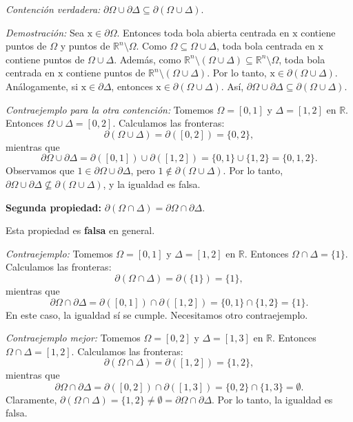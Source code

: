 \documentclass[12pt]{article}
\newcommand{\R}{\mathbb R}
\newcommand{\x}{\mathrm x}
\begin{document}
\begin{enumerate}
\begin{enumerate}[(1)]
\textit{Contención verdadera:} $\partial \Omega \cup \partial \Delta \subseteq \partial(\Omega \cup \Delta)$.

\textit{Demostración:} Sea $\x \in \partial \Omega$. Entonces toda bola abierta centrada en $\x$ contiene puntos de $\Omega$ y puntos de $\R^n \setminus \Omega$. Como $\Omega \subseteq \Omega \cup \Delta$, toda bola centrada en $\x$ contiene puntos de $\Omega \cup \Delta$. Además, como $\R^n \setminus (\Omega \cup \Delta) \subseteq \R^n \setminus \Omega$, toda bola centrada en $\x$ contiene puntos de $\R^n \setminus (\Omega \cup \Delta)$. Por lo tanto, $\x \in \partial(\Omega \cup \Delta)$. Análogamente, si $\x \in \partial \Delta$, entonces $\x \in \partial(\Omega \cup \Delta)$. Así, $\partial \Omega \cup \partial \Delta \subseteq \partial(\Omega \cup \Delta)$.

\textit{Contraejemplo para la otra contención:} Tomemos $\Omega = [0,1]$ y $\Delta = [1,2]$ en $\R$. Entonces $\Omega \cup \Delta = [0,2]$. Calculamos las fronteras:
\[
\partial(\Omega \cup \Delta) = \partial([0,2]) = \{0, 2\},
\]
mientras que
\[
\partial \Omega \cup \partial \Delta = \partial([0,1]) \cup \partial([1,2]) = \{0, 1\} \cup \{1, 2\} = \{0, 1, 2\}.
\]
Observamos que $1 \in \partial \Omega \cup \partial \Delta$, pero $1 \notin \partial(\Omega \cup \Delta)$. Por lo tanto, $\partial \Omega \cup \partial \Delta \not\subseteq \partial(\Omega \cup \Delta)$, y la igualdad es falsa.

\textbf{Segunda propiedad:} $\partial(\Omega\cap \Delta) = \partial \Omega\cap \partial \Delta$.

Esta propiedad es \textbf{falsa} en general.

\textit{Contraejemplo:} Tomemos $\Omega = [0,1]$ y $\Delta = [1,2]$ en $\R$. Entonces $\Omega \cap \Delta = \{1\}$. Calculamos las fronteras:
\[
\partial(\Omega \cap \Delta) = \partial(\{1\}) = \{1\},
\]
mientras que
\[
\partial \Omega \cap \partial \Delta = \partial([0,1]) \cap \partial([1,2]) = \{0, 1\} \cap \{1, 2\} = \{1\}.
\]
En este caso, la igualdad sí se cumple. Necesitamos otro contraejemplo.

\textit{Contraejemplo mejor:} Tomemos $\Omega = [0,2]$ y $\Delta = [1,3]$ en $\R$. Entonces $\Omega \cap \Delta = [1,2]$. Calculamos las fronteras:
\[
\partial(\Omega \cap \Delta) = \partial([1,2]) = \{1, 2\},
\]
mientras que
\[
\partial \Omega \cap \partial \Delta = \partial([0,2]) \cap \partial([1,3]) = \{0, 2\} \cap \{1, 3\} = \emptyset.
\]
Claramente, $\partial(\Omega \cap \Delta) = \{1, 2\} \neq \emptyset = \partial \Omega \cap \partial \Delta$. Por lo tanto, la igualdad es falsa.


\end{enumerate}
\end{enumerate}
\end{document}
